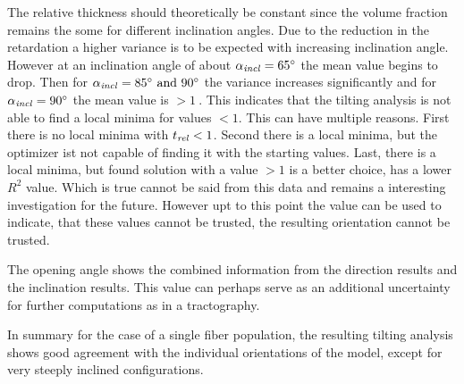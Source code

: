 \par
%
The relative thickness \trel{} should theoretically be constant since the volume fraction remains the some for different inclination angles.
Due to the reduction in the retardation a higher variance is to be expected with increasing inclination angle.
However at an inclination angle of about $\textnormal{$\alpha_{\mathit{incl}}$}=\SI{65}{\degree}$ the mean value begins to drop.
Then for $\modelInc=\SIlist{85;90}{\degree}$ the variance increases significantly and for $\textnormal{$\alpha_{\mathit{incl}}$}=\SI{90}{\degree}$ the mean value is $>\SI{1}{}$.
This indicates that the tilting analysis is not able to find a local minima for \trel{} values $<1$.
This can have multiple reasons.
First there is no local minima with $\textnormal{$t_\mathit{rel}$}<1$.
Second there is a local minima, but the optimizer ist not capable of finding it with the starting values.
Last, there is a local minima, but found solution with a \trel{} value $>1$ is a better choice, \ie{} has a lower $R^2$ value.
Which is true cannot be said from this data and remains a interesting investigation for the future.
However upt to this point the \trel{} value can be used to indicate, that these values cannot be trusted, \ie{} the resulting orientation cannot be trusted.
\par
%
The opening angle shows the combined information from the direction results and the inclination results.
This value can perhaps serve as an additional uncertainty for further computations as in a tractography.
\par
%
In summary for the case of a single fiber population, the resulting tilting analysis shows good agreement with the individual orientations of the model, except for very steeply inclined configurations.
%
% 
% 
